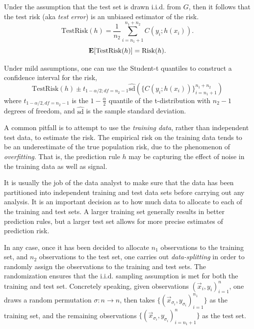 Under the assumption that the test set is drawn i.i.d. from $G$, then
it follows that the test risk (aka \emph{test error}) is an unbiased
estimator of the risk.
\[
\text{TestRisk}(h) = \frac{1}{n_2} \sum_{i=n_1+1}^{n_1 + n_2} C(y_i; h(x_i)).
\]
\[
\textbf{E}[\text{TestRisk}(h)] = \text{Risk}(h).
\]

Under mild assumptions, one can use the Student-t quantiles to
construct a confidence interval for the risk,
\[
\text{TestRisk}(h) \pm t_{1 - \alpha/2; df = n_2 - 1} \hat{\text{sd}}(\{C(y_i; h(x_i))\}_{i=n_1+1}^{n_1 + n_2})
\]
where $t_{1 - \alpha/2, df = n_2 - 1}$ is the $1 - \frac{\alpha}{2}$
quantile of the t-distribution with $n_2 - 1$ degrees of freedom, and
$\hat{\text{sd}}$ is the sample standard deviation.

A common pitfall is to attempt to use the \emph{training data}, rather
than independent test data, to estimate the risk.  The empirical risk
on the training data tends to be an underestimate of the true
population risk, due to the phenomenon of \emph{overfitting}.  That
is, the prediction rule $h$ may be capturing the effect of noise in
the training data as well as signal.

It is usually the job of the data analyst to make sure that the data
has been partitioned into independent training and test data sets
before carrying out any analysis.  It is an important decision as to
how much data to allocate to each of the training and test sets.  A
larger training set generally results in better prediction rules, but
a larger test set allows for more precise estimates of prediction
risk.

In any case, once it has been decided to allocate $n_1$ observations
to the training set, and $n_2$ observations to the test set, one
carries out \emph{data-splitting} in order to randomly assign the
observations to the training and test sets.  The randomization ensures
that the i.i.d. sampling assumption is met for both the training and
test set.  Concretely speaking, given observations $(\vec{x}_i,
y_i)_{i=1}^n$, one draws a random permutation $\sigma: n \to n$, then
takes $\{(\vec{x}_{\sigma_i}, y_{\sigma_i})_{i=1}^{n_1}\}$ as the
training set, and the remaining observations $\{(\vec{x}_{\sigma_i},
y_{\sigma_i})_{i=n_1 + 1}^{n}\}$ as the test set.

